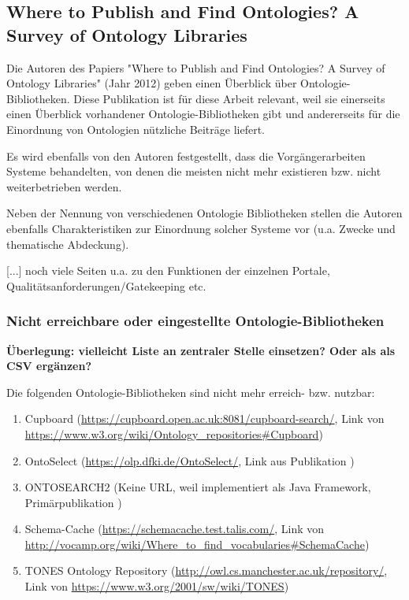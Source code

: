 \documentclass{article}
\begin{document}
\subsection{Where to Publish and Find Ontologies? A Survey of Ontology Libraries}

Die Autoren des Papiers "Where to Publish and Find Ontologies? A Survey of Ontology Libraries" \cite{d2012publish} (Jahr 2012) geben einen Überblick über Ontologie-Bibliotheken.
Diese Publikation ist für diese Arbeit relevant, weil sie einerseits einen Überblick vorhandener Ontologie-Bibliotheken gibt und andererseits für die Einordnung von Ontologien nützliche Beiträge liefert.

Es wird ebenfalls von den Autoren festgestellt, dass die Vorgängerarbeiten Systeme behandelten, von denen die meisten nicht mehr existieren bzw. nicht weiterbetrieben werden.

Neben der Nennung von verschiedenen Ontologie Bibliotheken stellen die Autoren ebenfalls Charakteristiken zur Einordnung solcher Systeme vor (u.a. Zwecke und thematische Abdeckung).

[...] noch viele Seiten u.a. zu den Funktionen der einzelnen Portale, Qualitätsanforderungen/Gatekeeping etc.

\subsubsection{Nicht erreichbare oder eingestellte Ontologie-Bibliotheken}

\textbf{Überlegung: vielleicht Liste an zentraler Stelle einsetzen? Oder als als CSV ergänzen?}

Die folgenden Ontologie-Bibliotheken sind nicht mehr erreich- bzw. nutzbar:

\begin{enumerate}
    \item Cupboard (\url{https://cupboard.open.ac.uk:8081/cupboard-search/}, Link von \url{https://www.w3.org/wiki/Ontology_repositories\#Cupboard})
    \item OntoSelect (\url{https://olp.dfki.de/OntoSelect/}, Link aus Publikation \cite{buitelaar2008ontology})
    \item ONTOSEARCH2 (Keine URL, weil implementiert als Java Framework, Primärpublikation \cite{pan2006ontosearch2})
    \item Schema-Cache (\url{https://schemacache.test.talis.com/}, Link von \url{http://vocamp.org/wiki/Where_to_find_vocabularies\#SchemaCache})
    \item TONES Ontology Repository (\url{http://owl.cs.manchester.ac.uk/repository/}, Link von \url{https://www.w3.org/2001/sw/wiki/TONES})
\end{enumerate}
\end{document}
